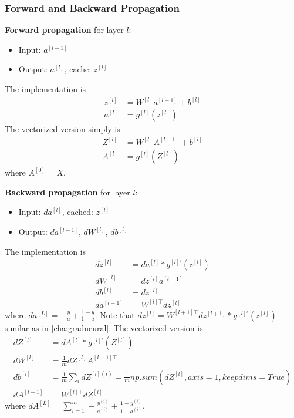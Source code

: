 \documentclass{article}
\begin{document}
\subsubsection{Forward and Backward Propagation}
\textbf{Forward propagation} for layer $l$:
\begin{itemize}
  \item Input: $a^{[l-1]}$
  \item Output: $a^{[l]}$, cache: $z^{[l]}$
\end{itemize}
The implementation is
\begin{equation}
  \begin{split}
    z^{[l]}&=W^{[l]}a^{[l-1]}+b^{[l]}\\
    a^{[l]}&=g^{[l]}(z^{[l]})
  \end{split}
\end{equation}
The vectorized version simply is
\begin{equation}
  \begin{split}
    Z^{[l]}&=W^{[l]}A^{[l-1]}+b^{[l]}\\
    A^{[l]}&=g^{[l]}(Z^{[l]})
  \end{split}
\end{equation}
where $A^{[0]}=X$.

\textbf{Backward propagation} for layer $l$:
\begin{itemize}
  \item Input: $da^{[l]}$, cached: $z^{[l]}$
  \item Output: $da^{[l-1]}$, $dW^{[l]}$, $db^{[l]}$
\end{itemize}
The implementation is
\begin{equation}
  \begin{split}
    dz^{[l]}&=da^{[l]}*g^{[l]\prime}(z^{[l]})\\
    dW^{[l]}&=dz^{[l]}a^{[l-1]}\\
    db^{[l]}&=dz^{[l]}\\
    da^{[l-1]}&=W^{[l]\top}dz^{[l]}
  \end{split}
\end{equation}
where $da^{[L]}=-\frac{y}{a}+\frac{1-y}{1-a}$.
Note that $dz^{[l]}=W^{[l+1]\top}dz^{[l+1]}*g^{[l]\prime}(z^{[l]})$ similar as in \cref{cha:gradneural}.
The vectorized version is
\begin{equation}
  \begin{split}
    dZ^{[l]}&=dA^{[l]}*g^{[l]\prime}(Z^{[l]})\\
    dW^{[l]}&=\frac{1}{m}dZ^{[l]}A^{[l-1]\top}\\
    db^{[l]}&=\frac{1}{m}\sum_i dZ^{[l](i)}=\frac{1}{m}np.sum(dZ^{[l]}, axis=1,keepdims=True)\\
    dA^{[l-1]}&=W^{[l]\top}dZ^{[l]}
  \end{split}
\end{equation}
where $dA^{[L]}=\sum_{i=1}^m-\frac{y^{(i)}}{a^{(i)}}+\frac{1-y^{(i)}}{1-a^{(i)}}$.
\end{document}
